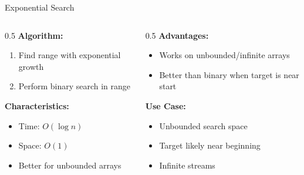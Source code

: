 \documentclass[aspectratio=169,xcolor=dvipsnames]{beamer}
\begin{document}
\begin{frame}{Exponential Search}
  \begin{columns}
    \begin{column}{0.5\textwidth}
      \textbf{Algorithm:}
      \begin{enumerate}
        \item Find range with exponential growth
        \item Perform binary search in range
      \end{enumerate}

      \vspace{0.3cm}
      \textbf{Characteristics:}
      \begin{itemize}
        \item Time: $O(\log n)$
        \item Space: $O(1)$
        \item Better for unbounded arrays
      \end{itemize}
    \end{column}

    \begin{column}{0.5\textwidth}
      \textbf{Advantages:}
      \begin{itemize}
        \item Works on unbounded/infinite arrays
        \item Better than binary when target is near start
      \end{itemize}

      \vspace{0.3cm}
      \textbf{Use Case:}
      \begin{itemize}
        \item Unbounded search space
        \item Target likely near beginning
        \item Infinite streams
      \end{itemize}
    \end{column}
  \end{columns}
\end{frame}
\end{document}
